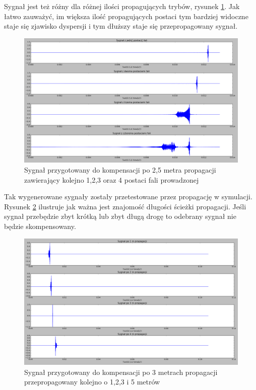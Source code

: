 Sygnał jest też różny dla różnej ilości propagujących trybów, rysunek \ref{fig:rozne_tryby}. Jak łatwo zauważyć, im większa ilość propagujących postaci tym bardziej widoczne staje się zjawisko dyspersji i tym dłuższy staje się przepropagowany sygnał.
\begin{figure}[h]
\centering
\includegraphics[width=14cm]{Zdjecia/4/TR-rozna_ilosc_modow}
\caption{Sygnał przygotowany do kompensacji po 2,5 metra propagacji zawierający kolejno 1,2,3 oraz 4 postaci fali prowadzonej}
\label{fig:rozne_tryby}
\end{figure}
Tak wygenerowane sygnały zostały przetestowane przez propagację w symulacji. Rysunek \ref{fig:100} ilustruje jak ważna jest znajomość długości ścieżki propagacji. Jeśli sygnał przebędzie zbyt krótką lub zbyt długą drogę to odebrany sygnał nie będzie skompensowany.
\begin{figure}[h]
\centering
\includegraphics[width=14cm]{Zdjecia/4/obrazek100}
\caption{Sygnał przygotowany do kompensacji po 3 metrach propagacji przepropagowany kolejno o 1,2,3 i 5 metrów}
\label{fig:100}
\end{figure}
